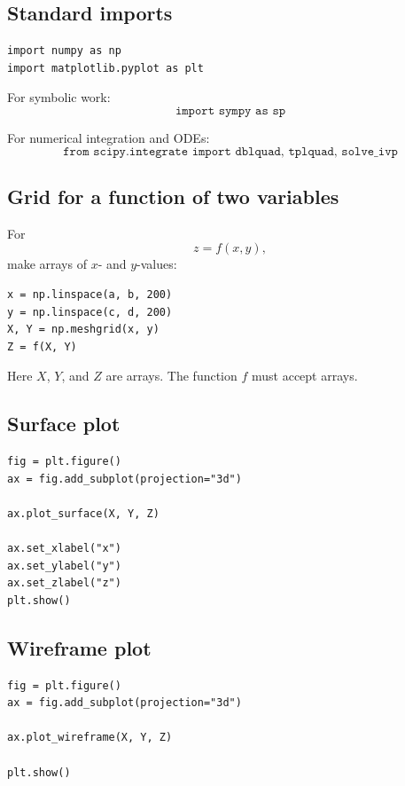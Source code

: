 \subsection*{Standard imports}

\begin{verbatim}
import numpy as np
import matplotlib.pyplot as plt
\end{verbatim}

For symbolic work:
\[
\boxed{
    \texttt{import sympy as sp}
}
\]

For numerical integration and ODEs:
\[
\boxed{
    \texttt{from scipy.integrate import dblquad, tplquad, solve\_ivp}
}
\]

\subsection*{Grid for a function of two variables}

For
\[
    z=f(x,y),
\]
make arrays of \(x\)- and \(y\)-values:

\begin{verbatim}
x = np.linspace(a, b, 200)
y = np.linspace(c, d, 200)
X, Y = np.meshgrid(x, y)
Z = f(X, Y)
\end{verbatim}

Here \(X\), \(Y\), and \(Z\) are arrays.  The function \(f\) must accept arrays.

\subsection*{Surface plot}

\begin{verbatim}
fig = plt.figure()
ax = fig.add_subplot(projection="3d")

ax.plot_surface(X, Y, Z)

ax.set_xlabel("x")
ax.set_ylabel("y")
ax.set_zlabel("z")
plt.show()
\end{verbatim}

\subsection*{Wireframe plot}

\begin{verbatim}
fig = plt.figure()
ax = fig.add_subplot(projection="3d")

ax.plot_wireframe(X, Y, Z)

plt.show()
\end{verbatim}

